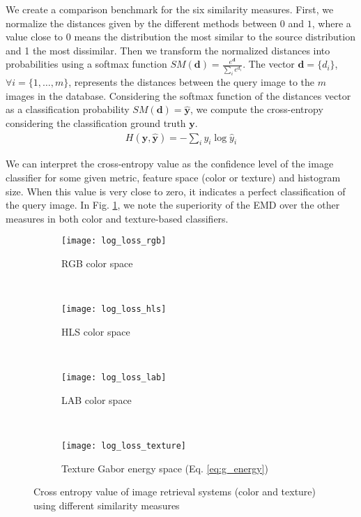We create a comparison benchmark for the six similarity measures. First, we normalize the distances given by the different methods between $0$ and $1$, where a value close to $0$ means the distribution the most similar to the source distribution and 1 the most dissimilar. Then we transform the normalized distances into probabilities using a softmax function $SM(\mathbf{d}) = \frac{e^{\mathbf{d}}}{\sum_{i}e^{d_i}}$. The vector $\mathbf{d}=\{d_i\}$, $\forall i=\{1, \ldots, m\}$, represents the distances between the query image to the $m$ images in the database. Considering the softmax function of the distances vector as a classification probability $SM(\mathbf{d})=\mathbf{\hat{y}}$,  we compute the cross-entropy \citep{Bishop:BOOK:2006} considering the classification ground truth $\mathbf{y}$. 
\begin{eqnarray}
H(\mathbf{y}, \mathbf{\hat{y}}) = - \sum\nolimits_{i}{y_i}\log \hat{y}_i
\label{eq:cross-entropy}
\end{eqnarray}

We can interpret the cross-entropy value as the confidence level of the image classifier for some given metric, feature space (color or texture) and histogram size. When this value is very close to zero, it indicates a perfect classification of the query image. In Fig. \ref{fig:cross_entropy}, we note the superiority of the EMD over the other measures in both color and texture-based classifiers.

\begin{figure}[ht]
    \centering
    \begin{subfigure}[b]{0.48\textwidth}
		\centering
		\texttt{[image: log\_loss\_rgb]}	
		\caption{RGB color space}
	\end{subfigure}
    ~ %
    \begin{subfigure}[b]{0.48\textwidth}
		\centering
		\texttt{[image: log\_loss\_hls]}	
		\caption{HLS color space}
	\end{subfigure}\\[2ex]
	
	
    \begin{subfigure}[b]{0.48\textwidth}
		\centering
		\texttt{[image: log\_loss\_lab]}	
		\caption{LAB color space}
	\end{subfigure}   
    ~ %
    \begin{subfigure}[b]{0.48\textwidth}
		\centering
		\texttt{[image: log\_loss\_texture]}	
		\caption{Texture Gabor energy space (Eq. \ref{eq:g_energy})}
	\end{subfigure}  
		
	\caption{Cross entropy value of image retrieval systems (color and texture) using different similarity measures}
	\label{fig:cross_entropy}
\end{figure}

